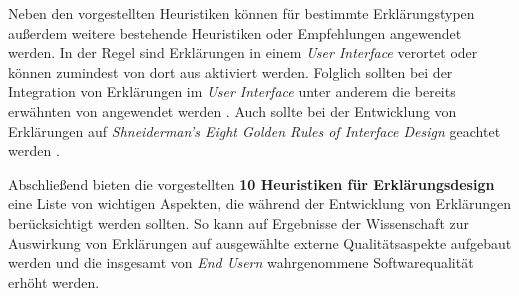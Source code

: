 Neben den vorgestellten Heuristiken können für bestimmte Erklärungstypen außerdem weitere bestehende Heuristiken oder Empfehlungen angewendet werden. In der Regel sind Erklärungen in einem \textit{User Interface} verortet oder können zumindest von dort aus aktiviert werden. Folglich sollten bei der Integration von Erklärungen im \textit{User Interface} unter anderem die bereits erwähnten  von \citeauthor{nielsen10usability} angewendet werden \cite{nielsen10usability}. Auch sollte bei der Entwicklung von Erklärungen auf \textit{Shneiderman’s Eight Golden Rules of Interface Design} geachtet werden \cite{shneiderman2016designing}.

Abschließend bieten die vorgestellten \textbf{10 Heuristiken für Erklärungsdesign} eine Liste von wichtigen Aspekten, die während der Entwicklung von Erklärungen berücksichtigt werden sollten. So kann auf Ergebnisse der Wissenschaft zur Auswirkung von Erklärungen auf ausgewählte externe Qualitätsaspekte aufgebaut werden und die insgesamt von \textit{End Usern} wahrgenommene Softwarequalität erhöht werden.


